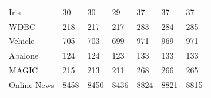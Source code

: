 \begin{tabular}{lllllll}
Iris & 30 & 30 & 29 & 37 & 37 & 37 \\
WDBC & 218 & 217 & 217 & 283 & 284 & 285 \\
Vehicle & 705 & 703 & 699 & 971 & 969 & 971 \\
Abalone & 124 & 124 & 123 & 133 & 133 & 133 \\
MAGIC & 215 & 213 & 211 & 268 & 266 & 265 \\
Online News & 8458 & 8450 & 8436 & 8824 & 8821 & 8815 \\
\end{tabular}
